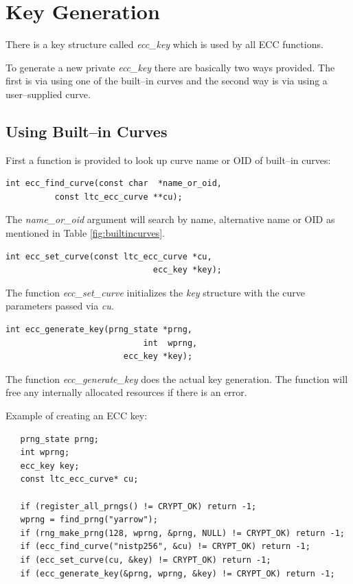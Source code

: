 \documentclass[synpaper]{book}
\newcommand{\mysection}[1]    %
	{                   %
	\section{#1}
   \markboth{\textsf{www.libtom.net}}{\thesection ~ {#1}}
	}
\begin{document}
\mysection{Key Generation}

There is a key structure called \textit{ecc\_key} which is used by all ECC functions.

To generate a new private \textit{ecc\_key} there are basically two ways provided.
The first is via using one of the built--in curves and the second way is via using a user--supplied curve.

\subsection{Using Built--in Curves}

First a function is provided to look up curve name or OID of built--in curves:
\begin{verbatim}
int ecc_find_curve(const char  *name_or_oid,
          const ltc_ecc_curve **cu);
\end{verbatim}

The \textit{name\_or\_oid} argument will search by name, alternative name or OID as mentioned in Table \ref{fig:builtincurves}.

\begin{verbatim}
int ecc_set_curve(const ltc_ecc_curve *cu,
                              ecc_key *key);
\end{verbatim}

The function \textit{ecc\_set\_curve} initializes the \textit{key} structure with the curve parameters passed via \textit{cu}.

\begin{verbatim}
int ecc_generate_key(prng_state *prng,
                            int  wprng,
                        ecc_key *key);
\end{verbatim}

The function \textit{ecc\_generate\_key} does the actual key generation. The function will free any internally
allocated resources if there is an error.

Example of creating an ECC key:
\begin{small}
\begin{verbatim}
   prng_state prng;
   int wprng;
   ecc_key key;
   const ltc_ecc_curve* cu;

   if (register_all_prngs() != CRYPT_OK) return -1;
   wprng = find_prng("yarrow");
   if (rng_make_prng(128, wprng, &prng, NULL) != CRYPT_OK) return -1;
   if (ecc_find_curve("nistp256", &cu) != CRYPT_OK) return -1;
   if (ecc_set_curve(cu, &key) != CRYPT_OK) return -1;
   if (ecc_generate_key(&prng, wprng, &key) != CRYPT_OK) return -1;
\end{verbatim}
\end{small}
\end{document}
